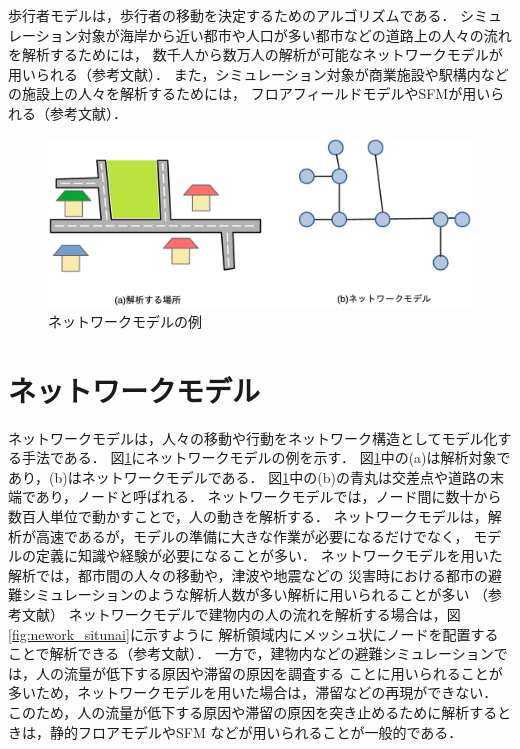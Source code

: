 歩行者モデルは，歩行者の移動を決定するためのアルゴリズムである．
シミュレーション対象が海岸から近い都市や人口が多い都市などの道路上の人々の流れを解析するためには，
数千人から数万人の解析が可能なネットワークモデルが用いられる（参考文献）．
また，シミュレーション対象が商業施設や駅構内などの施設上の人々を解析するためには，
フロアフィールドモデルやSFMが用いられる（参考文献）．
\fi
\begin{figure}[t]

  \begin{center}
     \includegraphics[width=13cm,clip]{figure/networkmodel_ex.eps}
     \caption{ネットワークモデルの例}
     \label{fig:network_ex}
    \end{center}
\end{figure}

\section{ネットワークモデル}
ネットワークモデルは，人々の移動や行動をネットワーク構造としてモデル化する手法である．
図\ref{fig:network_ex}にネットワークモデルの例を示す．
図\ref{fig:network_ex}中の(a)は解析対象であり，(b)はネットワークモデルである．
図\ref{fig:network_ex}中の(b)の青丸は交差点や道路の末端であり，ノードと呼ばれる．
ネットワークモデルでは，ノード間に数十から数百人単位で動かすことで，人の動きを解析する．
ネットワークモデルは，解析が高速であるが，モデルの準備に大きな作業が必要になるだけでなく，
モデルの定義に知識や経験が必要になることが多い．
ネットワークモデルを用いた解析では，都市間の人々の移動や，津波や地震などの
災害時における都市の避難シミュレーションのような解析人数が多い解析に用いられることが多い
（参考文献）
ネットワークモデルで建物内の人の流れを解析する場合は，図\ref{fig:nework_situnai}に示すように
解析領域内にメッシュ状にノードを配置することで解析できる（参考文献）．
一方で，建物内などの避難シミュレーションでは，人の流量が低下する原因や滞留の原因を調査する
ことに用いられることが多いため，ネットワークモデルを用いた場合は，滞留などの再現ができない．
このため，人の流量が低下する原因や滞留の原因を突き止めるために解析するときは，静的フロアモデルやSFM
などが用いられることが一般的である．
%
%
\clearpage
